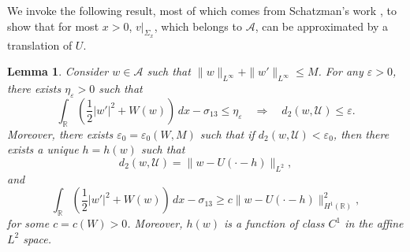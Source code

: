 \documentclass[leqno,11pt]{amsart}
\let\f=\frac
\let\S=\Sigma
\let\e=\varepsilon
\newtheorem{lemma}[theorem]{Lemma}
\theoremstyle{remark}
\newcommand{\BR}{\mathbb{R}}
\begin{document}
We invoke the following result, most of which comes from Schatzman's work \cite{schatzman2002asymmetric},  to show that for most $x>0$, $v|_{\S_x}$, which belongs to $\mathcal{A}$, can be approximated by a translation of $U$.

\begin{lemma}
\label{lem: appr by U}
Consider $w\in\mathcal{A}$ such that $\|w\|_{L^\infty}+\|w'\|_{L^\infty}\leq M$. For any $\e>0$, there exists $\eta_\e>0$ such that
\begin{equation}\label{close ene control L2}
 \int_\BR \left(\f12|w'|^2+W(w)\right)\,dx-\sigma_{13}\leq\eta_\e\quad\Rightarrow\quad d_2(w,\mathcal{U})\leq\e.
\end{equation}
Moreover, there exists $\e_{0}=\e_0(W,M)$ such that if $d_2(w,\mathcal{U})<\e_0$,  then there exists a unique $h=h(w)$ such that 
    \begin{equation*}
        d_2(w,\mathcal{U})=\|w-U(\cdot- h)\|_{L^2},
    \end{equation*}
and
\begin{equation}\label{ene coercivity}
 \int_\BR\left(\f12|w'|^2+W(w)\right)\,dx-\sigma_{13}\ge c\|w-U(\cdot-h)\|_{H^1(\BR)}^2,
\end{equation}
for some $c=c(W)>0$. Moreover, $h(w)$ is a function of class $C^{1}$ in the affine $L^2$ space. 
\end{lemma}
\end{document}
